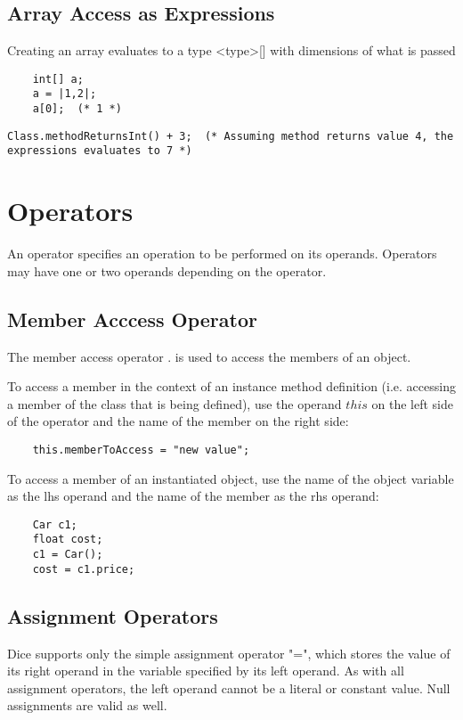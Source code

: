 \begin{homeworkProblem}
	\subsection{Array Access as Expressions}
	Creating an array evaluates to a type \textless type\textgreater[] with dimensions of what is passed
	\begin{verbatim}
	int[] a;
	a = |1,2|;
	a[0];  (* 1 *)
	\end{verbatim}
	
	
	\begin{verbatim}
Class.methodReturnsInt() + 3;  (* Assuming method returns value 4, the expressions evaluates to 7 *)
	\end{verbatim}
	
	\section{Operators}
		
	An operator specifies an operation to be performed on its operands. Operators may have one or two operands depending on the operator. 
	
	\subsection{Member Acccess Operator}
	The member access operator . is used to access the members of an object.
	
	To access a member in the context of an instance method definition (i.e. accessing a member of the class that is being defined), use the operand $this$ on the left side of the operator and the name of the member on the right side:
	\begin{verbatim}
	this.memberToAccess = "new value";
	\end{verbatim}
	
	To access a member of an instantiated object, use the name of the object variable as the lhs operand and the name of the member as the rhs operand:
	\begin{verbatim}
	Car c1;
	float cost;
	c1 = Car();
	cost = c1.price;
	\end{verbatim}

	\subsection{Assignment Operators}
		
	Dice supports only the simple assignment operator "=", which stores the value of its right operand in the variable specified by its left operand. As with all assignment operators, the left operand cannot be a literal or constant value. Null assignments are valid as well.
		

\end{homeworkProblem}
